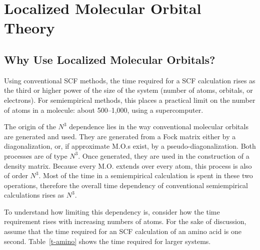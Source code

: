\section{Localized Molecular Orbital Theory}\label{lmot}
\subsection{Why Use Localized Molecular Orbitals?}
Using conventional SCF methods, the time required for a SCF calculation rises
as the third or higher power of the size of the system (number of atoms,
orbitals, or electrons).  For semiempirical methods, this places a practical
limit on the number of atoms in a molecule:   about 500--1,000, using a
supercomputer.  

 The origin of the $N^3$ dependence
lies in the way conventional molecular orbitals are generated and used.  They
are generated from a Fock matrix  either  by a diagonalization, or, if
approximate M.O.s exist, by a  pseudo-diagonalization.  Both processes are of
type $N^3$.  Once generated, they are used in the construction of a density
matrix.   Because every M.O. extends over every atom, this process is also of
order $N^3$.   Most of the time in a semiempirical calculation is spent in
these two operations, therefore the overall time dependency of conventional
semiempirical calculations rises as $N^3$.

To understand how limiting this dependency is, consider how the time
requirement rises with increasing numbers of atoms.  For the sake of
discussion, assume that the time required for an SCF calculation of an amino
acid is one second.  Table~\ref{t-amino} shows the time required for larger
systems.

